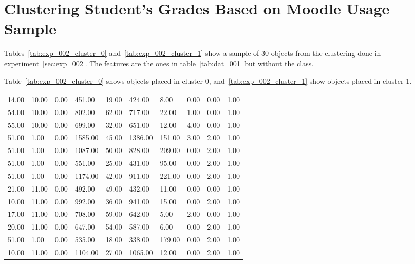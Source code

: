 \chapter{Clustering Student's Grades Based on Moodle Usage Sample}
\label{attach:exp_002}

Tables~\ref{tab:exp_002_cluster_0} and~\ref{tab:exp_002_cluster_1} show a
sample of 30 objects from the clustering done in experiment~\ref{sec:exp_002}.
The features are the ones in table~\ref{tab:dat_001} but without the class.

Table~\ref{tab:exp_002_cluster_0} shows objects placed in cluster 0,
and~\ref{tab:exp_002_cluster_1} show objects placed in cluster 1.

\begin{table}[h!]
    \centering

    \begin{tabular}{| l l l l l l l l l l |}
        \hline
        14.00 & 10.00 & 0.00 & 451.00 & 19.00 & 424.00 & 8.00 & 0.00 & 0.00 & 1.00 \\
        54.00 & 10.00 & 0.00 & 802.00 & 62.00 & 717.00 & 22.00 & 1.00 & 0.00 & 1.00 \\
        55.00 & 10.00 & 0.00 & 699.00 & 32.00 & 651.00 & 12.00 & 4.00 & 0.00 & 1.00 \\
        51.00 & 1.00 & 0.00 & 1585.00 & 45.00 & 1386.00 & 151.00 & 3.00 & 2.00 & 1.00 \\
        51.00 & 1.00 & 0.00 & 1087.00 & 50.00 & 828.00 & 209.00 & 0.00 & 2.00 & 1.00 \\
        51.00 & 1.00 & 0.00 & 551.00 & 25.00 & 431.00 & 95.00 & 0.00 & 2.00 & 1.00 \\
        51.00 & 1.00 & 0.00 & 1174.00 & 42.00 & 911.00 & 221.00 & 0.00 & 2.00 & 1.00 \\
        21.00 & 11.00 & 0.00 & 492.00 & 49.00 & 432.00 & 11.00 & 0.00 & 0.00 & 1.00 \\
        10.00 & 11.00 & 0.00 & 992.00 & 36.00 & 941.00 & 15.00 & 0.00 & 2.00 & 1.00 \\
        17.00 & 11.00 & 0.00 & 708.00 & 59.00 & 642.00 & 5.00 & 2.00 & 0.00 & 1.00 \\
        20.00 & 11.00 & 0.00 & 647.00 & 54.00 & 587.00 & 6.00 & 0.00 & 2.00 & 1.00 \\
        51.00 & 1.00 & 0.00 & 535.00 & 18.00 & 338.00 & 179.00 & 0.00 & 2.00 & 1.00 \\
        10.00 & 11.00 & 0.00 & 1104.00 & 27.00 & 1065.00 & 12.00 & 0.00 & 2.00 & 1.00 \\

\end{tabular}
\end{table}
